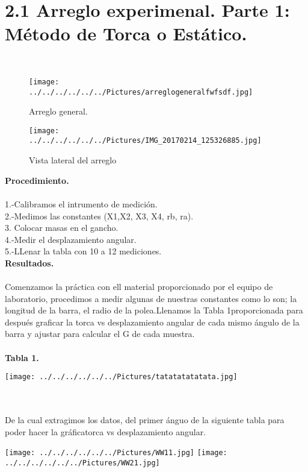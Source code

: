 \documentclass[10pt,a4paper]{article}
\begin{document}
\section*{2.1 Arreglo experimenal. Parte 1: M\'{e}todo de Torca o Est\'{a}tico.} \\

\begin{figure}[hbtp]
\centering
\texttt{[image: ../../../../../../Pictures/arreglogeneralfwfsdf.jpg]} 
\caption{Arreglo general.}
\end{figure}

\begin{figure}[hbtp]
\centering
\texttt{[image: ../../../../../../Pictures/IMG\_20170214\_125326885.jpg]}  
\caption{Vista lateral del arreglo}
\end{figure}

\pagebreak 

\textbf{Procedimiento.}\\
\\
1.-Calibramos el intrumento de medici\'{o}n.\\
2.-Medimos las constantes (X1,X2, X3, X4, rb, ra).\\
3. Colocar masas en el gancho.\\
4.-Medir el desplazamiento angular.\\
5.-LLenar la tabla con 10 a 12 mediciones.\\

\textbf{Resultados.}\\
\\
Comenzamos la pr\'{a}ctica con ell material proporcionado por el equipo de laboratorio, procedimos a medir algunas de nuestras constantes como lo son; la longitud de la barra, el radio de la polea.Llenamos la Tabla 1proporcionada para despu\'{e}s graficar la torca vs desplazamiento angular de cada mismo \'{a}ngulo de la barra y ajustar para calcular el G de cada muestra.\\
\\
\medskip
\textbf{Tabla 1.}
\\
\begin{figure 2}
\centering
\texttt{[image: ../../../../../../Pictures/tatatatatatata.jpg]} 
\end{figure 2}
\\
\\
De la cual extragimos los datos, del primer \'{a}nguo de la siguiente tabla para poder hacer la gr\'{a}ficatorca vs desplazamiento angular.
\\
\begin{figure 3}
\centering
\texttt{[image: ../../../../../../Pictures/WW11.jpg]}  
\texttt{[image: ../../../../../../Pictures/WW21.jpg]} 
\\
\caption{\textbf{Tabla 2.}  Datos tabulados para graficar.}
\end{figure 3}
\\
\end{document}
